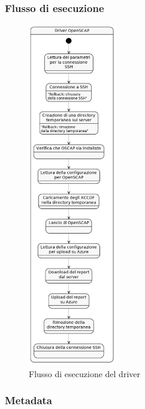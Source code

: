 \documentclass[../main.tex]{subfiles}
\begin{document}
\subsubsection{Flusso di esecuzione}
\begin{figure}[H]
\centering
\includegraphics[height=15cm]{immagini/DRIVER_OPENSCAP.png}
\caption{Flusso di esecuzione del driver}\label{fig:flussodriver1}

\end{figure}

\subsubsection{Metadata}
\end{document}
